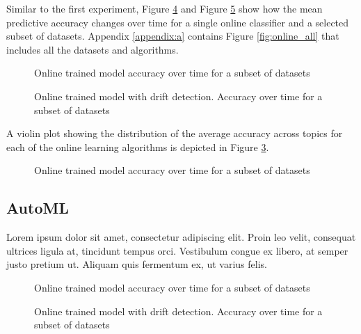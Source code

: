 \documentclass{sig-alternate-br}
\begin{document}
Similar to the first experiment, Figure \ref{fig:online_ht} and Figure \ref{fig:online_hat} show how the mean predictive accuracy changes over time for a single online classifier and a selected subset of datasets. Appendix \ref{appendix:a} contains Figure \ref{fig:online_all} that includes all the datasets and algorithms.

\begin{figure}[h]
\centering 
{}
\caption{Online trained model accuracy over time for a subset of datasets}
\label{fig:online_ht}
\end{figure}

\begin{figure}[h!]
\centering 
{}
\caption{Online trained model with drift detection. Accuracy over time for a subset of datasets}
\label{fig:online_hat}
\end{figure}


A violin plot showing the distribution of the average accuracy across topics for each of the online learning algorithms is depicted in Figure \ref{fig:online_violin}.

\begin{figure}[h]
\centering 
{}
\caption{Online trained model accuracy over time for a subset of datasets}
\label{fig:online_violin}
\end{figure}

\subsection{AutoML}

Lorem ipsum dolor sit amet, consectetur adipiscing elit. Proin leo velit, consequat ultrices ligula at, tincidunt tempus orci. Vestibulum congue ex libero, at semper justo pretium ut. Aliquam quis fermentum ex, ut varius felis.

\begin{figure}[h]
\centering 
{}
\caption{Online trained model accuracy over time for a subset of datasets}
\label{fig:online_ht}
\end{figure}

\begin{figure}[h]
\centering 
{}
\caption{Online trained model with drift detection. Accuracy over time for a subset of datasets}
\label{fig:online_hat}
\end{figure}
\end{document}

